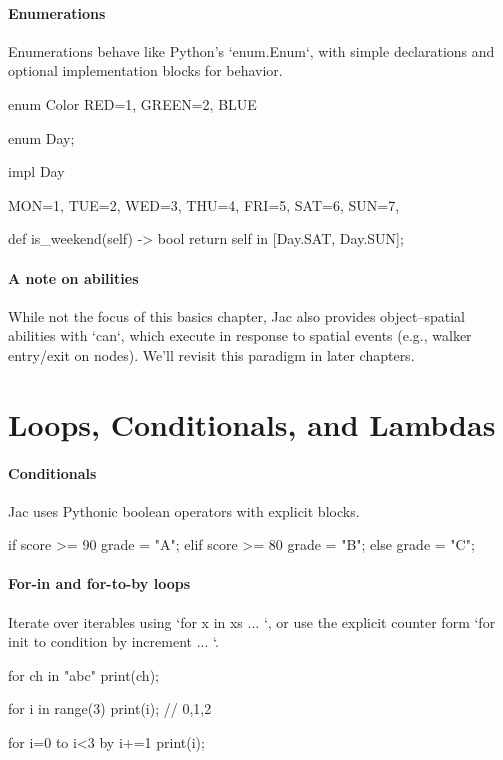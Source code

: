 \paragraph{Enumerations}

Enumerations behave like Python's `enum.Enum`, with simple declarations and optional implementation blocks for behavior.

\begin{jacblock}
enum Color { RED=1, GREEN=2, BLUE }

enum Day;

impl Day {
    MON=1, TUE=2, WED=3, THU=4, FRI=5, SAT=6, SUN=7,

    def is_weekend(self) -> bool { return self in [Day.SAT, Day.SUN]; }
}
\end{jacblock}

\paragraph{A note on abilities}

While not the focus of this basics chapter, Jac also provides object–spatial abilities with `can`, which execute in response to spatial events (e.g., walker entry/exit on nodes). We'll revisit this paradigm in later chapters.


\section{Loops, Conditionals, and Lambdas}

\paragraph{Conditionals}

Jac uses Pythonic boolean operators with explicit blocks.

\begin{jacblock}
if score >= 90 {
    grade = "A";
} elif score >= 80 {
    grade = "B";
} else {
    grade = "C";
}
\end{jacblock}

\paragraph{For-in and for-to-by loops}

Iterate over iterables using `for x in xs { ... }`, or use the explicit counter form `for init to condition by increment { ... }`.

\begin{jacblock}
for ch in "abc" { print(ch); }

for i in range(3) {
    print(i);  // 0,1,2
}

for i=0 to i<3 by i+=1 {
    print(i);
}
\end{jacblock}


